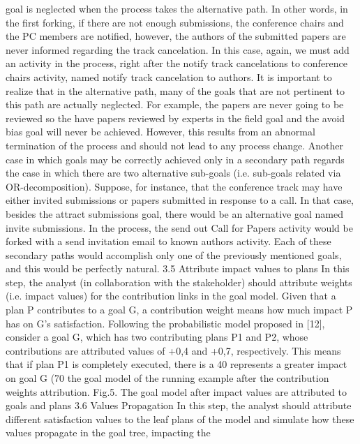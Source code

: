 goal is neglected when the process takes the alternative path. In other words, in the first
forking, if there are not enough submissions, the conference chairs and the PC members
are notified, however, the authors of the submitted papers are never informed regarding
the track cancelation. In this case, again, we must add an activity in the process, right
after the notify track cancelations to conference chairs activity, named notify track
cancelation to authors.
It is important to realize that in the alternative path, many of the goals that are not
pertinent to this path are actually neglected. For example, the papers are never going to
be reviewed so the have papers reviewed by experts in the field goal and the avoid
bias goal will never be achieved. However, this results from an abnormal termination
of the process and should not lead to any process change.
Another case in which goals may be correctly achieved only in a secondary path
regards the case in which there are two alternative sub-goals (i.e. sub-goals related via
OR-decomposition). Suppose, for instance, that the conference track may have either
invited submissions or papers submitted in response to a call. In that case, besides the 
attract submissions goal, there would be an alternative goal named invite submissions. In the process, the send out Call for Papers activity would be forked with a
send invitation email to known authors activity. Each of these secondary paths
would accomplish only one of the previously mentioned goals, and this would be perfectly natural.
3.5 Attribute impact values to plans
In this step, the analyst (in collaboration with the stakeholder) should attribute
weights (i.e. impact values) for the contribution links in the goal model. Given that a
plan P contributes to a goal G, a contribution weight means how much impact P has on
G’s satisfaction. Following the probabilistic model proposed in [12], consider a goal G,
which has two contributing plans P1 and P2, whose contributions are attributed values
of +0,4 and +0,7, respectively. This means that if plan P1 is completely executed, there
is a 40%
represents a greater impact on goal G (70%
the goal model of the running example after the contribution weights attribution.
Fig.5. The goal model after impact values are attributed to goals and plans
3.6 Values Propagation
In this step, the analyst should attribute different satisfaction values to the leaf plans
of the model and simulate how these values propagate in the goal tree, impacting the
